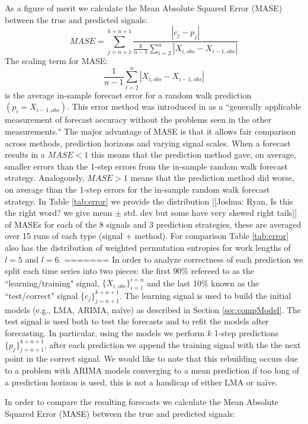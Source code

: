 \documentclass{article}
\begin{document}
As a figure of merit we calculate the Mean Absolute Squared Error (MASE)\cite{MASE} between the true and predicted signals: 
$$MASE = \sum_{j=n+1}^{k+n+1}\frac{|c_j-p_j| }{\frac{k}{n-1}\sum^n_{i=2}|X_{i,obs}-X_{i-1,obs}|}$$
The scaling term for MASE:
$$\frac{1}{n-1}\sum^n_{i=2}|X_{i,obs}-X_{i-1,obs}|$$ 
is the average in-sample forecast error for a random walk prediction $(p_i=X_{i-1,obs})$. This error method was introduced in \cite{MASE} as a ``generally applicable measurement of forecast accuracy without the problems seen in the other measurements." The major advantage of MASE is that it allows fair comparison across methods, prediction horizons and varying signal scales. When a forecast results in a $MASE<1$ this means that the prediction method gave, on average, smaller errors than the 1-step errors from the in-sample random walk forecast strategy. Analogously, $MASE>1$ means that the prediction method did worse, on average than the 1-step errors for the in-sample random walk forecast strategy. In Table \ref{tab:error} we provide the distribution [[Joshua: Ryan, Is this the right word? we give mean $\pm$ std. dev but some have very skewed right tails]]  of MASEs for each of the 8 signals and 3 prediction strategies, these are averaged over 15 runs of each type (signal + method). For comparison Table \ref{tab:error} also has the distribution of weighted permutation entropies for work lengths of $l=5$ and $l=6$.
=======
In order to analyze correctness of each prediction we split each time series
into two pieces: the first 90\% refereed to as the ``learning/training" signal,
$\{X_{i,obs}\}_{i=1}^{i=n}$ and the last 10\% known as the ``test/correct"
signal $\{c_j\}_{j=n+1}^{k+n+1}$. The learning signal is used to build the
initial models (e.g., LMA, ARIMA, na\"ive) as described in Section
\ref{sec:compModel}. The test signal is used both to test the forecasts and to
refit the models after forecasting. In particular, using the models we perform
$k$ 1-step predictions $\{p_j\}_{j=n+1}^{k+n+1}$, after each prediction we
append the training signal with the the next point in the correct signal. We
would like to note that this rebuilding occurs due to a problem with ARIMA
models converging to a mean prediction if too long of a prediction horizon is
used, this is not a handicap of either LMA or na\"ive.

In order to compare the resulting forecasts we calculate the Mean Absolute
Squared Error (MASE)\cite{MASE} between the true and predicted signals:
\end{document}
